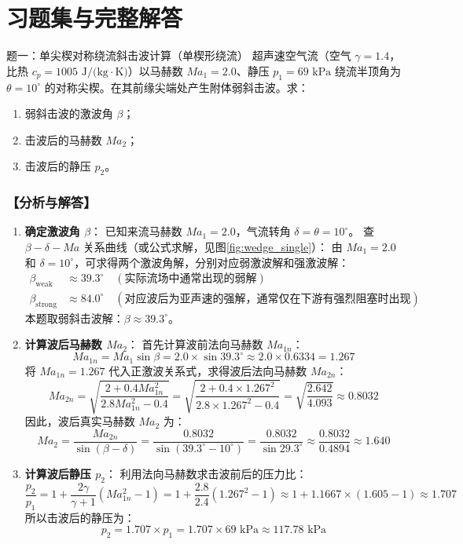 \documentclass[11pt,a4paper]{ctexart}
\begin{document}
\newpage

\section{习题集与完整解答}

\begin{questionbox}{题一：单尖楔对称绕流斜击波计算（单楔形绕流）}
超声速空气流（空气 $\gamma=1.4$，比热 $c_p = 1005\text{ J/(kg}\cdot\text{K)}$）以马赫数 $Ma_1 = 2.0$、静压 $p_1 = 69\text{ kPa}$ 绕流半顶角为 $\theta = 10^\circ$ 的对称尖楔。在其前缘尖端处产生附体弱斜击波。求：
\begin{enumerate}
    \item 弱斜击波的激波角 $\beta$；
    \item 击波后的马赫数 $Ma_2$；
    \item 击波后的静压 $p_2$。
\end{enumerate}
\end{questionbox}

\subsubsection*{【分析与解答】}
\begin{enumerate}
    \item \textbf{确定激波角 $\beta$}：
    已知来流马赫数 $Ma_1 = 2.0$，气流转角 $\delta = \theta = 10^\circ$。
    查 $\beta-\delta-Ma$ 关系曲线（或公式求解，见图\ref{fig:wedge_single}）：
    由 $Ma_1 = 2.0$ 和 $\delta = 10^\circ$，可求得两个激波角解，分别对应弱激波解和强激波解：
    \begin{align*}
        \beta_{\text{weak}} &\approx 39.3^\circ \quad (\text{实际流场中通常出现的弱解}) \\
        \beta_{\text{strong}} &\approx 84.0^\circ \quad (\text{对应波后为亚声速的强解，通常仅在下游有强烈阻塞时出现})
    \end{align*}
    本题取弱斜击波解：$\beta \approx 39.3^\circ$。

    \item \textbf{计算波后马赫数 $Ma_2$}：
    首先计算波前法向马赫数 $Ma_{1n}$：
    \[
    Ma_{1n} = Ma_1 \sin \beta = 2.0 \times \sin 39.3^\circ \approx 2.0 \times 0.6334 = 1.267
    \]
    将 $Ma_{1n} = 1.267$ 代入正激波关系式，求得波后法向马赫数 $Ma_{2n}$：
    \[
    Ma_{2n} = \sqrt{\frac{2 + 0.4 Ma_{1n}^2}{2.8 Ma_{1n}^2 - 0.4}} = \sqrt{\frac{2 + 0.4 \times 1.267^2}{2.8 \times 1.267^2 - 0.4}} = \sqrt{\frac{2.642}{4.093}} \approx 0.8032
    \]
    因此，波后真实马赫数 $Ma_2$ 为：
    \[
    Ma_2 = \frac{Ma_{2n}}{\sin(\beta - \delta)} = \frac{0.8032}{\sin(39.3^\circ - 10^\circ)} = \frac{0.8032}{\sin 29.3^\circ} \approx \frac{0.8032}{0.4894} \approx 1.640
    \]
    
    \item \textbf{计算波后静压 $p_2$}：
    利用法向马赫数求击波前后的压力比：
    \[
    \frac{p_2}{p_1} = 1 + \frac{2\gamma}{\gamma + 1}(Ma_{1n}^2 - 1) = 1 + \frac{2.8}{2.4}(1.267^2 - 1) \approx 1 + 1.1667 \times (1.605 - 1) \approx 1.707
    \]
    所以击波后的静压为：
    \[
    p_2 = 1.707 \times p_1 = 1.707 \times 69\text{ kPa} \approx 117.78\text{ kPa}
    \]
\end{enumerate}
\end{document}
